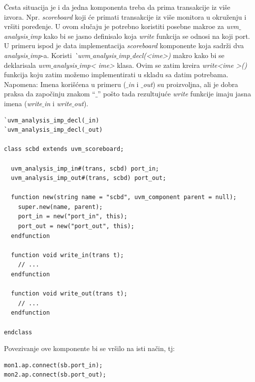 Česta situacija je i da jedna komponenta treba da prima transakcije iz više
izvora. Npr. \emph{scoreboard} koji će primati transakcije iz više monitora u
okruženju i vršiti poređenje. U ovom slučaju je potrebno koristiti posebne
makroe za \emph{uvm\(\_\)analysis\(\_\)imp} kako bi se jasno definisalo koja
\emph{write} funkcija se odnosi na koji port.\\

U primeru ispod je data implementacija \emph{scoreboard} komponente koja sadrži
dva \emph{analysis\(\_\)imp}-a. Koristi
\emph{\`\ uvm\(\_\)analysis\(\_\)imp\(\_\)decl(\textless ime\textgreater )} makro
kako bi se deklarisala \emph{uvm\(\_\)analysis\(\_\)imp\textless
  ime\textgreater} klasa. Ovim se zatim kreira \emph{write\textless ime
  \textgreater ()} funkcija koju zatim možemo implementirati u skladu sa datim
potrebama.\\

Napomena: Imena korišćena u primeru (\emph{\(\_\)in} i \emph{\(\_\)out}) su
proizvoljna, ali je dobra praksa da započinju znakom ``\(\_\)'' pošto tada
rezultujuće \emph{write} funkcije imaju jasna imena (\emph{write\(\_\)in} i
\emph{write\(\_\)out}).

\begin{lstlisting}
`uvm_analysis_imp_decl(_in)
`uvm_analysis_imp_decl(_out)

class scbd extends uvm_scoreboard;

  uvm_analysis_imp_in#(trans, scbd) port_in;
  uvm_analysis_imp_out#(trans, scbd) port_out;

  function new(string name = "scbd", uvm_component parent = null);
    super.new(name, parent);
    port_in = new("port_in", this);
    port_out = new("port_out", this);
  endfunction

  function void write_in(trans t);
    // ...
  endfunction

  function void write_out(trans t);
    // ...
  endfunction

endclass
\end{lstlisting}

Povezivanje ove komponente bi se vršilo na isti način, tj:

\begin{lstlisting}
mon1.ap.connect(sb.port_in);
mon2.ap.connect(sb.port_out);
\end{lstlisting}


